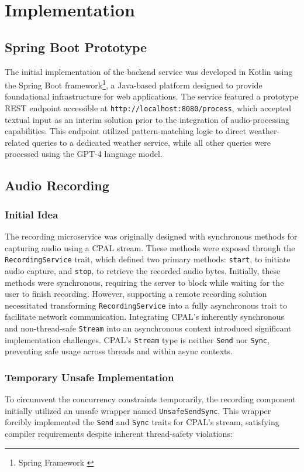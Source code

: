 \renewcommand*\chapterpagestyle{scrheadings}

\chapter{Implementation}

\section{Spring Boot Prototype}
The initial implementation of the backend service was developed in Kotlin using the Spring Boot framework\footnote{Spring Framework \cite{spring}},
a Java-based platform designed to provide foundational infrastructure for web applications.
The service featured a prototype REST endpoint accessible at \texttt{http://localhost:8080/process},
which accepted textual input as an interim solution prior to the integration of audio-processing capabilities.
This endpoint utilized pattern-matching logic to direct weather-related queries to a dedicated weather service,
while all other queries were processed using the GPT-4 language model.

\section{Audio Recording}

\subsection{Initial Idea}
The recording microservice was originally designed with synchronous methods for capturing audio using a CPAL stream.
These methods were exposed through the \texttt{RecordingService} trait, which defined two primary methods: \texttt{start},
to initiate audio capture, and \texttt{stop}, to retrieve the recorded audio bytes.
Initially, these methods were synchronous, requiring the server to block while waiting for the user to finish recording.
However, supporting a remote recording solution necessitated transforming \texttt{RecordingService} into a fully asynchronous trait to facilitate network communication.
Integrating CPAL's inherently synchronous and non-thread-safe \texttt{Stream} into an asynchronous context introduced significant implementation challenges.
CPAL's \texttt{Stream} type is neither \texttt{Send} nor \texttt{Sync}, preventing safe usage across threads and within async contexts.

\subsection{Temporary Unsafe Implementation}
To circumvent the concurrency constraints temporarily, the recording component initially utilized an unsafe wrapper named \texttt{UnsafeSendSync}.
This wrapper forcibly implemented the \texttt{Send} and \texttt{Sync} traits for CPAL's stream, satisfying compiler requirements despite inherent thread-safety violations:

